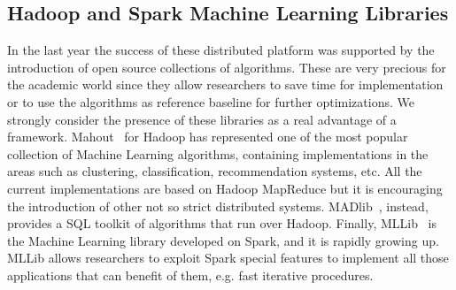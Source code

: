 \subsection{Hadoop and Spark Machine Learning Libraries}
In the last year the success of these distributed platform was supported by the introduction of open source collections of algorithms. These are very precious for the academic world since they allow researchers to save time for implementation or to use the algorithms as reference baseline for further optimizations. We strongly consider the presence of these libraries as a real advantage of a framework. 
Mahout~\cite{Mahout} for Hadoop has represented one of the most popular collection of Machine Learning algorithms, containing implementations in the areas such as clustering, classification, recommendation systems, etc. All the current implementations are based on Hadoop MapReduce but it is encouraging the introduction of other not so strict distributed systems. MADlib~\cite{madlib}, instead, provides a SQL toolkit of algorithms that run over Hadoop.
Finally, MLLib~\cite{MLLib} is the Machine Learning library developed on Spark, and it is rapidly growing up. MLLib allows researchers to exploit Spark special features to implement all those applications that can benefit of them, e.g. fast iterative procedures.
